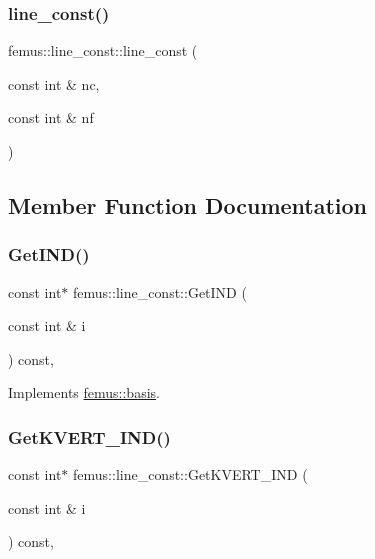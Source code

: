 \subsubsection{\texorpdfstring{line\+\_\+const()}{line\_const()}}
{\footnotesize\ttfamily femus\+::line\+\_\+const\+::line\+\_\+const (\begin{DoxyParamCaption}\item[{const int \&}]{nc,  }\item[{const int \&}]{nf }\end{DoxyParamCaption})\hspace{0.3cm}{\ttfamily [inline]}}



\subsection{Member Function Documentation}
\mbox{\label{classfemus_1_1line__const_ab73ed11bab4c16cde08b4f8d47ae90f7}} 
\subsubsection{\texorpdfstring{Get\+I\+N\+D()}{GetIND()}}
{\footnotesize\ttfamily const int$\ast$ femus\+::line\+\_\+const\+::\+Get\+I\+ND (\begin{DoxyParamCaption}\item[{const int \&}]{i }\end{DoxyParamCaption}) const\hspace{0.3cm}{\ttfamily [inline]}, {\ttfamily [virtual]}}



Implements \mbox{\hyperlink{classfemus_1_1basis_a3f63ad97ce70cd4a1196ede69f1f144b}{femus\+::basis}}.

\mbox{\label{classfemus_1_1line__const_a6fd1093aa51a8db78167a9b0ab684a4d}} 
\subsubsection{\texorpdfstring{Get\+K\+V\+E\+R\+T\+\_\+\+I\+N\+D()}{GetKVERT\_IND()}}
{\footnotesize\ttfamily const int$\ast$ femus\+::line\+\_\+const\+::\+Get\+K\+V\+E\+R\+T\+\_\+\+I\+ND (\begin{DoxyParamCaption}\item[{const int \&}]{i }\end{DoxyParamCaption}) const\hspace{0.3cm}{\ttfamily [inline]}, {\ttfamily [virtual]}}



